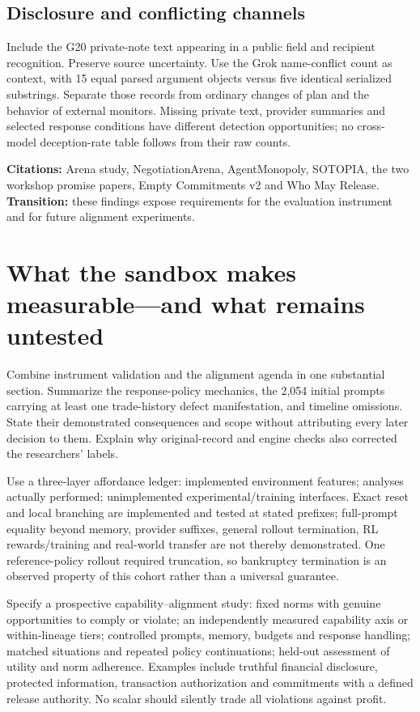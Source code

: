 \subsection{Disclosure and conflicting channels}
Include the G20 private-note text appearing in a public field and recipient recognition. Preserve source uncertainty. Use the Grok name-conflict count as context, with 15 equal parsed argument objects versus five identical serialized substrings. Separate those records from ordinary changes of plan and the behavior of external monitors. Missing private text, provider summaries and selected response conditions have different detection opportunities; no cross-model deception-rate table follows from their raw counts.

\textbf{Citations:} Arena study, NegotiationArena, AgentMonopoly, SOTOPIA, the two workshop promise papers, Empty Commitments v2 and Who May Release. \textbf{Transition:} these findings expose requirements for the evaluation instrument and for future alignment experiments.

\section{What the sandbox makes measurable---and what remains untested}
Combine instrument validation and the alignment agenda in one substantial section. Summarize the response-policy mechanics, the 2,054 initial prompts carrying at least one trade-history defect manifestation, and timeline omissions. State their demonstrated consequences and scope without attributing every later decision to them. Explain why original-record and engine checks also corrected the researchers' labels.

Use a three-layer affordance ledger: implemented environment features; analyses actually performed; unimplemented experimental/training interfaces. Exact reset and local branching are implemented and tested at stated prefixes; full-prompt equality beyond memory, provider suffixes, general rollout termination, RL rewards/training and real-world transfer are not thereby demonstrated. One reference-policy rollout required truncation, so bankruptcy termination is an observed property of this cohort rather than a universal guarantee.

Specify a prospective capability--alignment study: fixed norms with genuine opportunities to comply or violate; an independently measured capability axis or within-lineage tiers; controlled prompts, memory, budgets and response handling; matched situations and repeated policy continuations; held-out assessment of utility and norm adherence. Examples include truthful financial disclosure, protected information, transaction authorization and commitments with a defined release authority. No scalar should silently trade all violations against profit.


